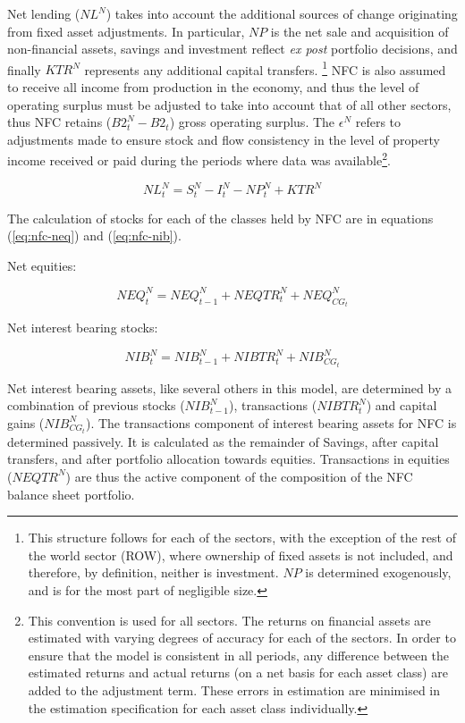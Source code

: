 \documentclass[
]{book}
\begin{document}
Net lending (\(NL^N\)) takes into account the additional sources of change
originating from fixed asset adjustments. In particular, \(NP\) is the net
sale and acquisition of non-financial assets, savings and investment reflect
\emph{ex post} portfolio decisions, and finally \(KTR^N\) represents any additional
capital transfers. \footnote{This structure follows for each of the sectors, with the exception of the rest of the world sector (ROW), where ownership of fixed assets is not included, and therefore, by definition, neither is investment. \(NP\) is determined exogenously, and is for the most part of negligible size.} NFC is also assumed to receive all
income from production in the economy, and thus the level of operating surplus must
be adjusted to take into account that of all other sectors, thus NFC retains
(\(B2^N_{t} - B2_{t}\)) gross operating surplus. The \(\epsilon ^N\) refers to adjustments made to ensure stock and flow consistency in the level of property income received or paid during the periods where data was available\footnote{This convention is used for all sectors. The returns on financial assets are estimated with varying degrees of accuracy for each of the sectors. In order to ensure that the model is consistent in all periods, any difference between the estimated returns and actual returns (on a net basis for each asset class) are added to the adjustment term. These errors in estimation are minimised in the estimation specification for each asset class individually.}.

\begin{equation}
NL^N_t = S^N_t - I^N_t- NP^N_t + KTR^N
\end{equation}

The calculation of stocks for each of the classes held by NFC are in equations (\ref{eq:nfc-neq})
and (\ref{eq:nfc-nib}).

Net equities:

\begin{equation}
NEQ^N_t = NEQ^N_{t-1} + NEQTR^N_t + NEQ^N_{CG_t}
\label{eq:nfc-neq}
\end{equation}

Net interest bearing stocks:

\begin{equation}
NIB^N_t = NIB^N_{t-1} + NIBTR^N_t + NIB^N_{CG_t}
\label{eq:nfc-nib}
\end{equation}

Net interest bearing assets, like several others in this model, are determined
by a combination of previous stocks (\(NIB^N_{t-1}\)), transactions (\(NIBTR^N_t\))
and capital gains (\(NIB^N_{CG_t}\)). The transactions component of interest
bearing assets for NFC is determined passively. It is calculated as the remainder
of Savings, after capital transfers, and after portfolio allocation towards
equities. Transactions in equities (\(NEQTR^N\)) are thus the active component of the composition
of the NFC balance sheet portfolio.
\end{document}

